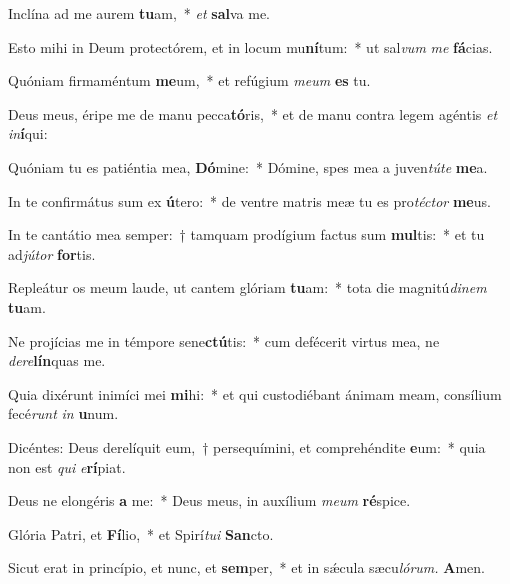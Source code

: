 \item Inclína ad me aurem \textbf{tu}am,~* \textit{et} \textbf{sal}va me.
\item Esto mihi in Deum prote\-ctórem, et in locum mu\textbf{ní}tum:~* ut sal\textit{vum} \textit{me} \textbf{fá}cias.
\item Quóniam firmaméntum \textbf{me}um,~* et refúgium \textit{meum} \textbf{es} tu.
\item Deus meus, éripe me de manu pecca\textbf{tó}ris,~* et de manu contra legem agéntis \textit{et} \textit{in}\textbf{í}qui:
\item Quóniam tu es patiéntia mea, \textbf{Dó}mine:~* Dómine, spes mea a juven\textit{túte} \textbf{me}a.
\item In te confirmátus sum ex \textbf{ú}tero:~* de ventre matris meæ tu es pro\tinyhspace\textit{téctor} \textbf{me}us.
\item In te cantátio mea semper:~† tamquam prodígium factus sum \textbf{mul}tis:~* et tu ad\textit{jútor} \textbf{for}tis.
\item Repleátur os meum laude, ut cantem glóriam \textbf{tu}am:~* tota die magnitú\hspace{0.02em}\textit{dinem} \textbf{tu}am.
\item Ne projícias me in témpore sene\textbf{ctú}tis:~* cum defécerit virtus mea, ne \textit{dere}\textbf{lín}quas me.
\item Quia dixérunt inimíci mei \textbf{mi}hi:~* et qui custodiébant ánimam meam, consílium fecé\tinyhspace\textit{runt} \textit{in} \textbf{u}num.
\item Dicéntes: Deus derelíquit eum,~† persequímini, et comprehéndite \textbf{e}um:~* quia non est \textit{qui} \textit{e}\textbf{rí}piat.
\item Deus ne elongéris \textbf{a} me:~* Deus meus, in auxílium \textit{meum} \textbf{ré}spice.
\item Glória Patri, et \textbf{Fí}lio,~* et Spirí\tinyhspace\textit{tui} \textbf{San}cto.
\item Sicut erat in princípio, et nunc, et \textbf{sem}per,~* et in sǽcula sæcu\tinyhspace\textit{lórum.} \textbf{A}men.

